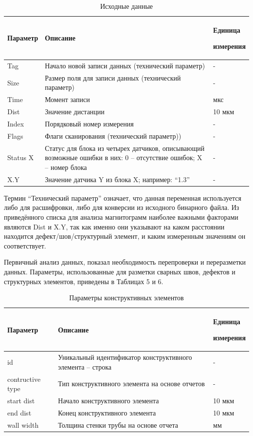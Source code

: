 \documentclass[a4paper,article,14pt]{extarticle}
\begin{document}
\begin{center}
\begin{longtable}{|p{2cm}|p{12cm}|p{2cm}|}
    \caption{Исходные данные}\\\hline
    Параметр & Описание & Единица \par измерения \\ \hline
    Tag & Начало новой записи данных (технический параметр) & - \\ \hline
    Size & Размер поля для записи данных (технический параметр) & - \\ \hline
    Time & Момент записи & мкс \\ \hline
    Dist & Значение дистанции & 10 мкм \\ \hline
    Index & Порядковый номер измерения & - \\ \hline
    Flags & Флаги сканирования (технический параметр)) & - \\ \hline
    Status X & Статус для блока из четырех датчиков, описывающий возможные ошибки в них: 0 – отсутствие ошибок; X – номер блока & - \\ \hline
    X.Y & Значение датчика Y из блока X; например: “1.3” & - \\ \hline
\end{longtable}
\end{center}

Термин “Технический параметр” означает, что данная переменная используется либо для расшифровки, 
либо для конверсии из исходного бинарного файла. Из приведённого списка для анализа магнитограмм 
наиболее важными факторами являются Dist и X.Y, так как именно они указывают на каком расстоянии 
находится дефект/шов/структурный элемент, и каким измеренным значениям он соответствует.

Первичный анализ данных, показал необходимость перепроверки и переразметки данных. Параметры, 
использованные для разметки сварных швов, дефектов и структурных элементов, приведены в Таблицах 5 и 6.

\begin{center}
    \begin{longtable}{|p{2cm}|p{12cm}|p{2cm}|}
        \caption{Параметры конструктивных элементов}\\\hline
        Параметр & Описание & Единица \par измерения \\ \hline
        id & Уникальный идентификатор конструктивного элемента – строка & - \\ \hline
        contructive type & Тип конструктивного элемента на основе отчетов & - \\ \hline
        start dist & Начало конструктивного элемента & 10 мкм \\ \hline
        end dist & Конец конструктивного элемента & 10 мкм \\ \hline
        wall width & Толщина стенки трубы на основе отчета & мм \\ \hline
    \end{longtable}
\end{center}
\end{document}
